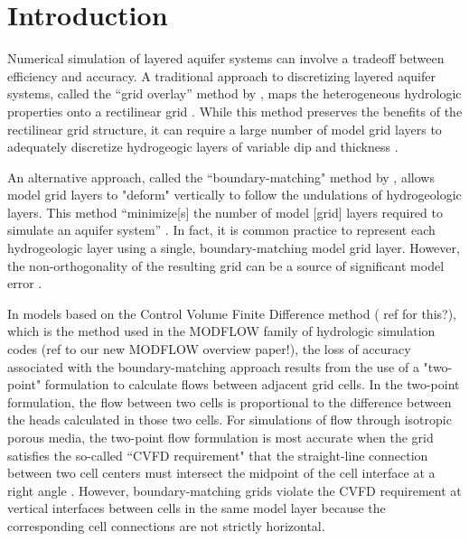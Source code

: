 \documentclass{article}
\begin{document}
\section{Introduction}

Numerical simulation of layered aquifer systems can involve a tradeoff between efficiency and accuracy. A traditional approach to discretizing layered aquifer systems, called the ``grid overlay'' method by \cite{hoaglund2003}, maps the heterogeneous hydrologic properties onto a rectilinear grid \citep{modflow84}. While this method preserves the benefits of the rectilinear grid structure, it can require a large number of model grid layers to adequately discretize hydrogeogic layers of variable dip and thickness \citep{Zyvoloski2006}.

An alternative approach, called the ``boundary-matching" method by \cite{hoaglund2003}, allows model grid layers to "deform" vertically to follow the undulations of hydrogeologic layers. This method ``minimize[s] the number of model [grid] layers required to simulate an aquifer system'' \citep{modflow84}. In fact, it is common practice to represent each hydrogeologic layer using a single, boundary-matching model grid layer. However, the non-orthogonality of the resulting grid can be a source of significant model error \citep{hoaglund2003}.

In models based on the Control Volume Finite Difference method {(\color{red} ref for this?)}, which is the method used in the MODFLOW family of hydrologic simulation codes \citep{modflow6gwf}{\color{red} (ref to our new MODFLOW overview paper!)}, the loss of accuracy associated with the boundary-matching approach results from the use of a "two-point" formulation to calculate flows between adjacent grid cells. In the two-point formulation, the flow between two cells is proportional to the difference between the heads calculated in those two cells. For simulations of flow through isotropic porous media, the two-point flow formulation is most accurate when the grid satisfies the so-called ``CVFD requirement" \citep{modflow6gwf} that the straight-line connection between two cell centers must intersect the midpoint of the cell interface at a right angle \citep{narasimhan1976integrated}. However, boundary-matching grids violate the CVFD requirement at vertical interfaces between cells in the same model layer because the corresponding cell connections are not strictly horizontal.
\end{document}
